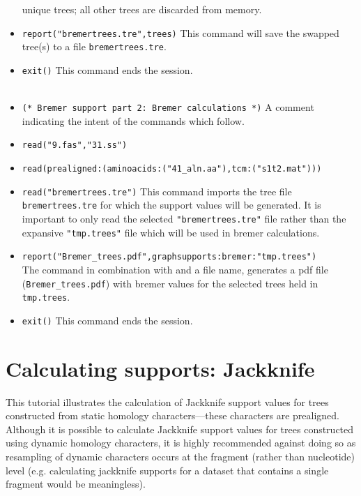 \begin{itemize}
 unique trees; all other trees are discarded from memory. 
\item \texttt{report("bremertrees.tre",trees)} This command will save the swapped tree(s) to a file 
\texttt{bremertrees.tre}. 
\item \texttt{exit()} This command ends the \poy session.
\\
\\
\item \texttt{(* Bremer support part 2: Bremer calculations *)}  A comment indicating the intent of the commands 
which follow.
\item \texttt{read("9.fas","31.ss")}
\item \texttt{read(prealigned:(aminoacids:("41\_aln.aa"),tcm:("s1t2.mat")))}
\item \texttt{read("bremertrees.tre")} This command imports the tree file \\ \texttt{bremertrees.tre} for which the support 
values will be generated.  It is important to only read the selected \texttt{"bremertrees.tre"} file rather than the 
expansive \texttt{"tmp.trees"} file which will be used in bremer calculations.
\item \texttt{report("Bremer\_trees.pdf",graphsupports:bremer:"tmp.trees")} \\The {} command 
in combination with  and a file name, generates a pdf file (\texttt{Bremer\_trees.pdf}) 
with bremer values for the selected trees held in \texttt{tmp.trees}.  
\item \texttt{exit()} This command ends the \poy session.
\end{itemize}


\section{Calculating supports: Jackknife}{\label{tutorial5}}

This tutorial illustrates the calculation of Jackknife support values for trees constructed from static homology 
characters---these characters are prealigned.  Although it is possible to calculate Jackknife support values for trees constructed using 
dynamic homology characters, it is highly recommended against doing so as resampling of dynamic characters occurs 
at the fragment (rather than nucleotide) level (e.g. calculating jackknife supports for a dataset that contains a single fragment
would be meaningless). 

